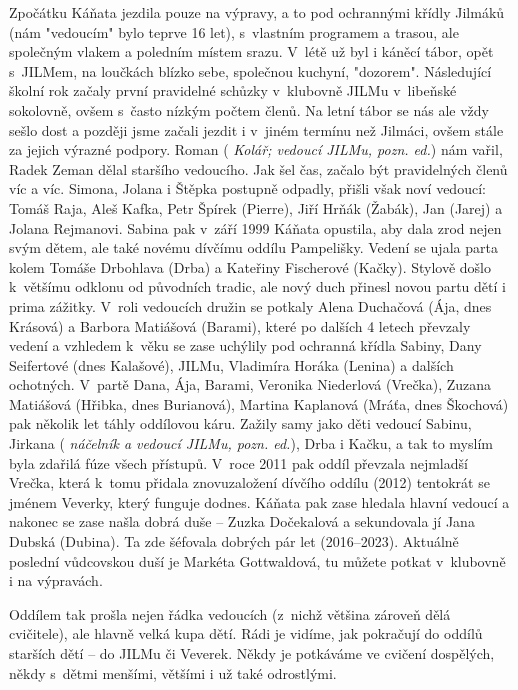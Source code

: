 \documentclass[a5paper, 11pt, twoside]{article}
\newcommand{\pozned}[1]{%
\textit{#1}}
\begin{document}
Zpočátku Káňata jezdila pouze na výpravy, a to pod ochrannými křídly
Jilmáků (nám "vedoucím" bylo teprve 16 let), s~vlastním programem a
trasou, ale společným vlakem a poledním místem srazu. V~létě už byl i
káněcí tábor, opět s~JILMem, na loučkách blízko sebe, společnou kuchyní,
"dozorem". Následující školní rok začaly první pravidelné schůzky
v~klubovně JILMu v~libeňské sokolovně, ovšem s~často nízkým počtem členů.
Na letní tábor se nás ale vždy sešlo dost a později jsme začali jezdit i
v~jiném termínu než Jilmáci, ovšem stále za jejich výrazné podpory.
Roman (\pozned{Kolář; vedoucí JILMu, pozn. ed.}) nám vařil, Radek Zeman
dělal staršího vedoucího. Jak šel čas, začalo být pravidelných členů víc
a víc. Simona, Jolana i Štěpka postupně odpadly, přišli však noví
vedoucí: Tomáš Raja, Aleš Kafka, Petr Špírek (Pierre), Jiří Hrňák
(Žabák), Jan (Jarej) a Jolana Rejmanovi. Sabina pak v~září 1999 Káňata
opustila, aby dala zrod nejen svým dětem, ale také novému dívčímu oddílu
Pampelišky. Vedení se ujala parta kolem Tomáše Drbohlava (Drba) a
Kateřiny Fischerové (Kačky). Stylově došlo k~většímu odklonu od
původních tradic, ale nový duch přinesl novou partu dětí i prima
zážitky. V~roli vedoucích družin se potkaly Alena Duchačová (Ája, dnes
Krásová) a Barbora Matiášová (Barami), které po dalších 4 letech
převzaly vedení a vzhledem k~věku se zase uchýlily pod ochranná křídla
Sabiny, Dany Seifertové (dnes Kalašové), JILMu, Vladimíra Horáka
(Lenina) a dalších ochotných. V~partě Dana, Ája, Barami, Veronika
Niederlová (Vrečka), Zuzana Matiášová (Hřibka, dnes Burianová), Martina
Kaplanová (Mráťa, dnes Škochová) pak několik let táhly oddílovou káru.
Zažily samy jako děti vedoucí Sabinu, Jirkana (\pozned{náčelník a vedoucí JILMu,
pozn. ed.}), Drba i Kačku, a tak to myslím byla zdařilá fúze všech
přístupů. V~roce 2011 pak oddíl převzala nejmladší Vrečka, která k~tomu
přidala znovuzaložení dívčího oddílu (2012) tentokrát se jménem Veverky,
který funguje dodnes. Káňata pak zase hledala hlavní vedoucí a nakonec
se zase našla dobrá duše -- Zuzka Dočekalová a sekundovala jí Jana
Dubská (Dubina). Ta zde šéfovala dobrých pár let (2016--2023). Aktuálně
poslední vůdcovskou duší je Markéta Gottwaldová, tu můžete potkat
v~klubovně i na výpravách.

Oddílem tak prošla nejen řádka vedoucích (z~nichž většina zároveň dělá
cvičitele), ale hlavně velká kupa dětí. Rádi je vidíme, jak pokračují do
oddílů starších dětí -- do JILMu či Veverek. Někdy je potkáváme ve
cvičení dospělých, někdy s~dětmi menšími, většími i už také odrostlými.
\end{document}
